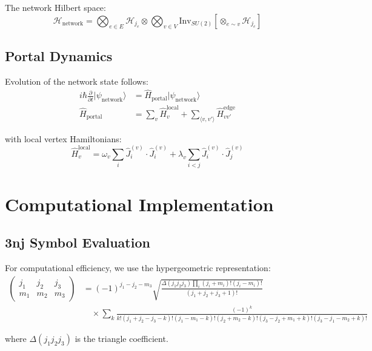\documentclass{article}
\begin{document}
The network Hilbert space:
\begin{equation}
\mathcal{H}_{\text{network}} = \bigotimes_{e \in E} \mathcal{H}_{j_e} \otimes \bigotimes_{v \in V} \text{Inv}_{SU(2)}[\otimes_{e \sim v} \mathcal{H}_{j_e}]
\end{equation}

\subsection{Portal Dynamics}

Evolution of the network state follows:
\begin{align}
i\hbar \frac{\partial}{\partial t} |\psi_{\text{network}}\rangle &= \hat{H}_{\text{portal}} |\psi_{\text{network}}\rangle \\
\hat{H}_{\text{portal}} &= \sum_{v} \hat{H}_v^{\text{local}} + \sum_{\langle v,v' \rangle} \hat{H}_{vv'}^{\text{edge}}
\end{align}

with local vertex Hamiltonians:
\begin{equation}
\hat{H}_v^{\text{local}} = \omega_v \sum_{i} \hat{J}_i^{(v)} \cdot \hat{J}_i^{(v)} + \lambda_v \sum_{i<j} \hat{J}_i^{(v)} \cdot \hat{J}_j^{(v)}
\end{equation}

\section{Computational Implementation}

\subsection{3nj Symbol Evaluation}

For computational efficiency, we use the hypergeometric representation:
\begin{align}
\begin{pmatrix} j_1 & j_2 & j_3 \\ m_1 & m_2 & m_3 \end{pmatrix} &= (-1)^{j_1-j_2-m_3} \sqrt{\frac{\Delta(j_1j_2j_3) \prod_i (j_i + m_i)! (j_i - m_i)!}{(j_1+j_2+j_3+1)!}} \\
&\quad \times \sum_k \frac{(-1)^k}{k!(j_1+j_2-j_3-k)!(j_1-m_1-k)!(j_2+m_2-k)!(j_3-j_2+m_1+k)!(j_3-j_1-m_2+k)!}
\end{align}

where $\Delta(j_1j_2j_3)$ is the triangle coefficient.
\end{document}
